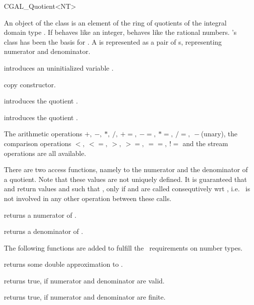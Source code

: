\clearpage
\begin {classtemplate} {CGAL_Quotient<NT>}
\label{CGAL_Quotient}

An object of the class  is an element of the 
ring of quotients of the integral domain type .
If  behaves like an integer, 
behaves like the rational numbers. \leda's class
 has been the basis for .
A   is represented as a pair of 
s, representing numerator and denominator.


\creation
{}

             {introduces an uninitialized variable \var.}

\hidden {}
 	    {copy constructor.}

            {introduces the quotient .}

            {introduces the quotient .}


\operations
The arithmetic operations $+,\ -,\ *,\ /,\ +=,\
-=,\ *=,\ /=,\ -$(unary),
the comparison operations $<,\ <=,\ >,\ 
>=,\ ==,\ !=$ and the stream operations are all available.

\threecolumns{5cm}{4cm}

There are two access functions, namely to the
numerator and the denominator of a quotient.
Note that these values are not uniquely defined. 
It is guaranteed that  and 
 return values  and
\CCstyle{nt_den} such that , only
if  \CCstyle{q.numerator()} and \CCstyle{q.denominator()} are called
consequtively wrt \CCstyle{q}, i.e.~\CCstyle{q} is not involved in 
any other operation between these calls.

       {returns a numerator of .}

       {returns a denominator of .}

\hidden {}
{}

The following functions are added to fulfill the \cgal\ requirements
on number types.

       {returns some double approximation to .}

       {returns true, if numerator and denominator are valid.}

       {returns true, if numerator and denominator are finite.}

\end {classtemplate} 

